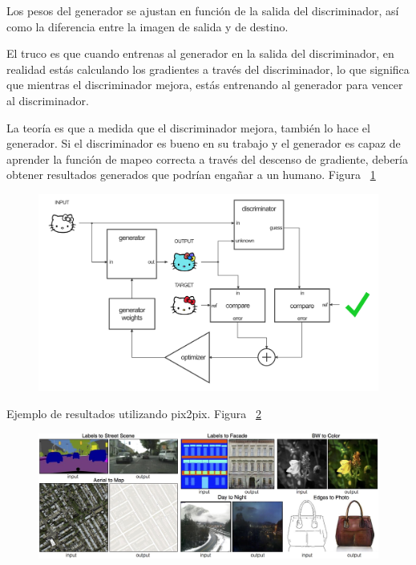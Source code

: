 \documentclass[10pt,journal,compsoc]{IEEEtran}\usepackage[T1]{fontenc}                              %
\begin{document}
Los pesos del generador se ajustan en función de la salida del
discriminador, así como la diferencia entre la imagen de salida y de
destino.

El truco es que cuando entrenas al generador en la salida del
discriminador, en realidad estás calculando los gradientes a través del
discriminador, lo que significa que mientras el discriminador mejora,
estás entrenando al generador para vencer al discriminador.

La teoría es que a medida que el discriminador mejora, también lo hace
el generador. Si el discriminador es bueno en su trabajo y el generador
es capaz de aprender la función de mapeo correcta a través del descenso
de gradiente, debería obtener resultados generados que podrían engañar a
un humano. Figura ~\ref{fig:9}

\begin{figure}[!htb]
  \begin{center}
    \includegraphics[width=\linewidth]{./imgs/10_pix2pix_example.png}
    \caption{}
    \label{fig:9}
  \end{center}
\end{figure}

Ejemplo de resultados utilizando pix2pix. Figura ~\ref{fig:10}

\begin{figure}[!htb]
  \begin{center}
    \includegraphics[width=\linewidth]{./imgs/11_pix2pix_example.jpg}
    \caption{}
    \label{fig:10}
  \end{center}
\end{figure}
\end{document}
